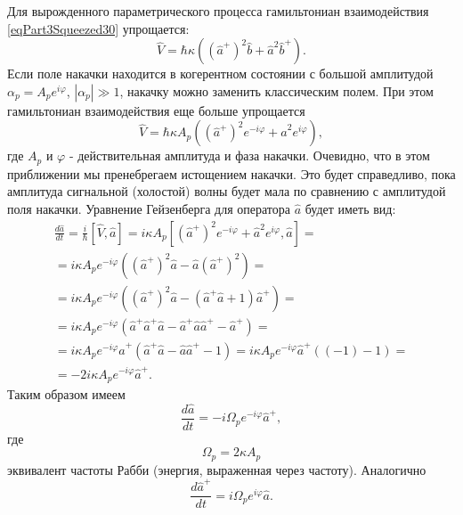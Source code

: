 Для вырожденного параметрического процесса гамильтониан взаимодействия
\eqref{eqPart3Squeezed30} упрощается:
\begin{equation}
\hat{V} = \hbar \kappa \left(
\left(\hat{a}^{+}\right)^2 \hat{b} + 
\hat{a}^2 \hat{b}^{+}
\right).
\nonumber
\end{equation}
Если поле накачки находится в когерентном состоянии с большой
амплитудой $\alpha_p = A_p e^{i \varphi}$, $\left|\alpha_p\right| \gg
1$, накачку можно заменить классическим полем. При этом гамильтониан
взаимодействия еще больше упрощается
\begin{equation}
\hat{V} = \hbar \kappa A_p\left(
\left(\hat{a}^{+}\right)^2 e^{- i \varphi} + 
\hat{a}^2 e^{i \varphi}
\right),
\nonumber
\end{equation}
где $A_p$ и $\varphi$ - действительная амплитуда и фаза
накачки. Очевидно, что в этом приближении мы пренебрегаем истощением
накачки. Это будет справедливо, пока амплитуда сигнальной (холостой)
волны будет мала по сравнению с амплитудой поля накачки. Уравнение
Гейзенберга для оператора $\hat{a}$ будет иметь вид:
\begin{eqnarray}
\frac{d\hat{a}}{dt} = \frac{i}{\hbar}
\left[\hat{V}, \hat{a}\right] = i \kappa A_p
\left[
\left(\hat{a}^{+}\right)^2 e^{- i \varphi} + 
\hat{a}^2 e^{i \varphi},
\hat{a}
\right] = 
\nonumber \\
=
i \kappa A_p e^{- i \varphi}
\left(
\left(
\hat{a}^{+}\right)^2  \hat{a} -
\hat{a}
\left(
\hat{a}^{+}\right)^2
\right) = 
\nonumber \\
=
i \kappa A_p e^{- i \varphi}
\left(
\left(
\hat{a}^{+}\right)^2  \hat{a} -
\left(\hat{a}^{+}\hat{a} + 1\right)
\hat{a}^{+}
\right) = 
\nonumber \\
=
i \kappa A_p e^{- i \varphi}
\left(
\hat{a}^{+}\hat{a}^{+}  \hat{a} -
\hat{a}^{+}\hat{a}\hat{a}^{+} -
\hat{a}^{+}
\right) = 
\nonumber \\
=
i \kappa A_p e^{- i \varphi}
\hat{a}^{+}
\left(
\hat{a}^{+}  \hat{a} -
\hat{a}\hat{a}^{+} -
1
\right) = 
i \kappa A_p e^{- i \varphi}
\hat{a}^{+}
\left(
\left(-1\right) -
1
\right) =
\nonumber \\
= 
- 2 i \kappa A_p e^{- i \varphi}
\hat{a}^{+}.
\nonumber
\end{eqnarray}
Таким образом имеем
\begin{equation}
\frac{d\hat{a}}{dt} = 
- i \Omega_p e^{- i \varphi}
\hat{a}^{+},
\label{eqPart3Squeezed34a}
\end{equation}
где 
\[
\Omega_p = 2 \kappa A_p
\]
эквивалент частоты Рабби (энергия, выраженная через частоту).
Аналогично
\begin{equation}
\frac{d\hat{a}^{+}}{dt} = 
i \Omega_p e^{i \varphi}
\hat{a}.
\label{eqPart3Squeezed34b}
\end{equation}

